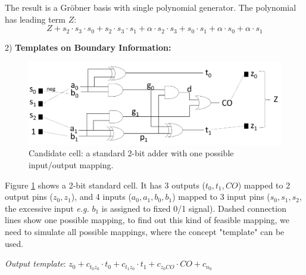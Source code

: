 The result is a Gr\"obner basis with single polynomial generator. The polynomial has leading term $Z$:
$$Z+s_2\cdot s_3\cdot s_0+s_2\cdot s_3\cdot s_1+\alpha\cdot s_2\cdot s_3+s_0\cdot s_1+\alpha\cdot s_0+\alpha\cdot s_1$$


2) {\bf Templates on Boundary Information:}
\begin{figure}[bp]
	\begin{center}
	\includegraphics[width=\textwidth]{newfig/template.pdf}
	\end{center}
	\caption{Candidate cell: a standard 2-bit adder with one possible input/output mapping.}
	\label{fig:template}
\end{figure}

Figure \ref{fig:template} shows a 2-bit standard cell. It has 3 outputs ($t_0,t_1,CO$) mapped to 2 output pins ($z_0,z_1$),
and 4 inputs ($a_0,a_1,b_0,b_1$) mapped to 3 input pins ($s_0,s_1,s_2$, the excessive input {\it e.g.} $b_1$ is assigned to fixed 0/1 signal). Dashed connection
lines show one possible mapping, to find out this kind of feasible mapping, we need to simulate
all possible mappings, where the concept "template" can be used.

{\it Output template}: $z_0+c_{{t_0}{z_0}}\cdot t_0+c_{t_1z_0}\cdot t_1+c_{z_0CO}\cdot CO+c_{n_0}$

